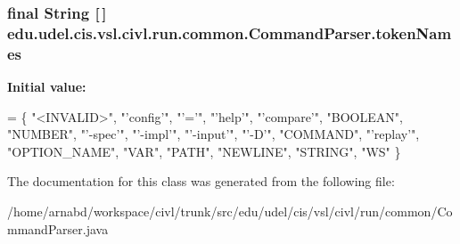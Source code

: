 \subsubsection[{token\+Names}]{\setlength{\rightskip}{0pt plus 5cm}final String \mbox{[}$\,$\mbox{]} edu.\+udel.\+cis.\+vsl.\+civl.\+run.\+common.\+Command\+Parser.\+token\+Names\hspace{0.3cm}{\ttfamily [static]}}\label{classedu_1_1udel_1_1cis_1_1vsl_1_1civl_1_1run_1_1common_1_1CommandParser_acd6b4fe74d7c068f46686262b26dd91a}
{\bfseries Initial value\+:}
\begin{DoxyCode}
= \{
        \textcolor{stringliteral}{"<INVALID>"}, \textcolor{stringliteral}{"'config'"}, \textcolor{stringliteral}{"'='"}, \textcolor{stringliteral}{"'help'"}, \textcolor{stringliteral}{"'compare'"}, \textcolor{stringliteral}{"BOOLEAN"}, \textcolor{stringliteral}{"NUMBER"}, 
        \textcolor{stringliteral}{"'-spec'"}, \textcolor{stringliteral}{"'-impl'"}, \textcolor{stringliteral}{"'-input'"}, \textcolor{stringliteral}{"'-D'"}, \textcolor{stringliteral}{"COMMAND"}, \textcolor{stringliteral}{"'replay'"}, \textcolor{stringliteral}{"OPTION\_NAME"}, 
        \textcolor{stringliteral}{"VAR"}, \textcolor{stringliteral}{"PATH"}, \textcolor{stringliteral}{"NEWLINE"}, \textcolor{stringliteral}{"STRING"}, \textcolor{stringliteral}{"WS"}
    \}
\end{DoxyCode}


The documentation for this class was generated from the following file\+:\begin{DoxyCompactItemize}
\item 
/home/arnabd/workspace/civl/trunk/src/edu/udel/cis/vsl/civl/run/common/Command\+Parser.\+java\end{DoxyCompactItemize}
